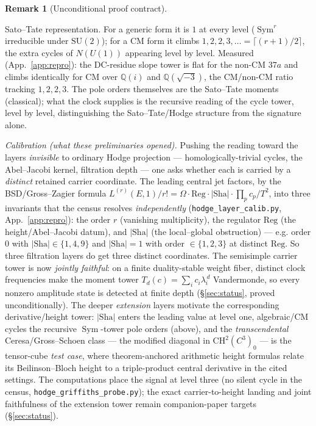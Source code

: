 \documentclass[11pt]{article}
\theoremstyle{definition}
\newtheorem{remark}[theorem]{Remark}
\newcommand{\Sym}{\operatorname{Sym}}
\newcommand{\Sha}{\mathrm{Sha}}
\begin{document}
\begin{remark}[Unconditional proof contract]
\begin{enumerate}
Sato--Tate representation. For a generic form it is $1$ at every level ($\Sym^r$ irreducible under
$\mathrm{SU}(2)$); for a CM form it climbs $1,2,2,3,\dots=\lceil(r{+}1)/2\rceil$, the extra cycles of
$N(U(1))$ appearing level by level. Measured (App.~\ref{app:repro}): the DC-residue slope tower is flat for
the non-CM $37a$ and climbs identically for CM over $\mathbb Q(i)$ and $\mathbb Q(\sqrt{-3})$, the
CM/non-CM ratio tracking $1,2,2,3$. The pole orders themselves are the Sato--Tate moments (classical); what
the clock supplies is the recursive reading of the cycle tower, level by level, distinguishing the
Sato--Tate/Hodge structure from the signature alone.

\emph{Calibration (what these preliminaries opened).} Pushing the reading toward the layers
\emph{invisible} to ordinary Hodge projection --- homologically-trivial cycles, the Abel--Jacobi kernel,
filtration depth --- one asks whether each is carried by a \emph{distinct} retained carrier coordinate.
The leading central jet factors, by the BSD/Gross--Zagier formula
$L^{(r)}(E,1)/r!=\Omega\cdot\mathrm{Reg}\cdot|\Sha|\cdot\prod_p c_p/T^2$, into three invariants that the
census resolves \emph{independently} (\texttt{hodge\_layer\_calib.py}, App.~\ref{app:repro}): the order
$r$ (vanishing multiplicity), the regulator $\mathrm{Reg}$ (the height/Abel--Jacobi datum),
and $|\Sha|$ (the local--global obstruction) --- e.g. order $0$ with $|\Sha|\in\{1,4,9\}$ and
$|\Sha|=1$ with order $\in\{1,2,3\}$ at distinct $\mathrm{Reg}$. So three filtration layers do get three
distinct coordinates. The semisimple carrier tower is now \emph{jointly faithful}: on a finite
duality-stable weight fiber, distinct clock frequencies make the moment tower
$T_d(c)=\sum_i c_i\lambda_i^{\,d}$ Vandermonde, so every nonzero amplitude state is detected at finite
depth (\S\ref{sec:status}, proved unconditionally). The deeper \emph{extension} layers motivate the
corresponding derivative/height tower: $|\Sha|$ enters the leading value at level one, algebraic/CM cycles
the recursive $\Sym$-tower pole orders (above), and the \emph{transcendental} Ceresa/Gross--Schoen class
--- the modified diagonal in $\mathrm{CH}^2(C^3)_0$ --- is the tensor-cube \emph{test case}, where
theorem-anchored arithmetic height formulas relate its Beilinson--Bloch height to a triple-product central
derivative in the cited settings. The computations place the signal at level three (no silent cycle in the
census, \texttt{hodge\_griffiths\_probe.py}); the exact carrier-to-height landing and joint faithfulness of
the extension tower remain companion-paper targets (\S\ref{sec:status}).


\end{enumerate}
\end{remark}
\end{document}
